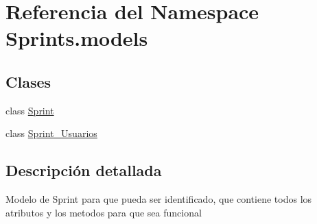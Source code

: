 \hypertarget{namespace_sprints_1_1models}{}\section{Referencia del Namespace Sprints.\+models}
\label{namespace_sprints_1_1models}
\subsection*{Clases}
\begin{DoxyCompactItemize}
\item 
class \hyperlink{class_sprints_1_1models_1_1_sprint}{Sprint}
\item 
class \hyperlink{class_sprints_1_1models_1_1_sprint___usuarios}{Sprint\+\_\+\+Usuarios}
\end{DoxyCompactItemize}


\subsection{Descripción detallada}
\begin{DoxyVerb}Modelo de Sprint para que pueda ser identificado, que contiene todos los atributos y los metodos
para que sea funcional \end{DoxyVerb}
 